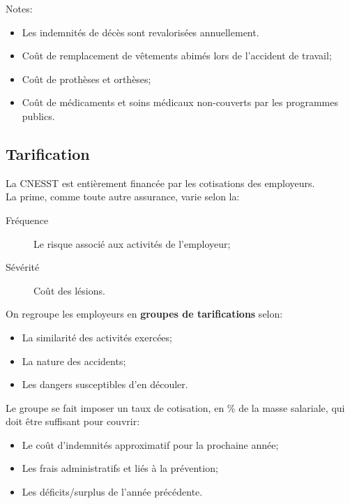 \documentclass[10pt, french]{article}
\begin{document}
\begin{multicols*}{3}
\begin{definitionNOHFILL}
Notes:
\begin{itemize}
	\item	Les indemnités de décès sont revalorisées annuellement.
\end{itemize}
\end{definitionNOHFILL}

\begin{definitionNOHFILL}
\begin{itemize}[leftmargin = *]
	\item	Coût de remplacement de vêtements abimés lors de l'accident de travail;
	\item	Coût de prothèses et orthèses;
	\item	Coût de médicaments et soins médicaux non-couverts par les programmes publics.
\end{itemize}
\end{definitionNOHFILL}

\subsection*{Tarification}
La CNESST est entièrement financée par les cotisations des employeurs.\\

La prime, comme toute autre assurance, varie selon la:
\begin{description}
	\item[Fréquence]	Le risque associé aux activités de l'employeur;
	\item[Sévérité]	Coût des lésions.
\end{description}

On regroupe les employeurs en \textbf{groupes de tarifications} selon: 
\begin{itemize}[leftmargin = *]
	\item	La similarité des activités exercées;
	\item	La nature des accidents;
	\item	Les dangers susceptibles d'en découler.
\end{itemize}

Le groupe se fait imposer un taux de cotisation, en \% de la masse salariale, qui doit être suffisant pour couvrir:
\begin{itemize}[leftmargin = *]
	\item	Le coût d'indemnités approximatif pour la prochaine année;
	\item	Les frais administratifs et liés à la prévention;
	\item	Les déficits/surplus de l'année précédente.
\end{itemize}


\end{multicols*}
\end{document}
